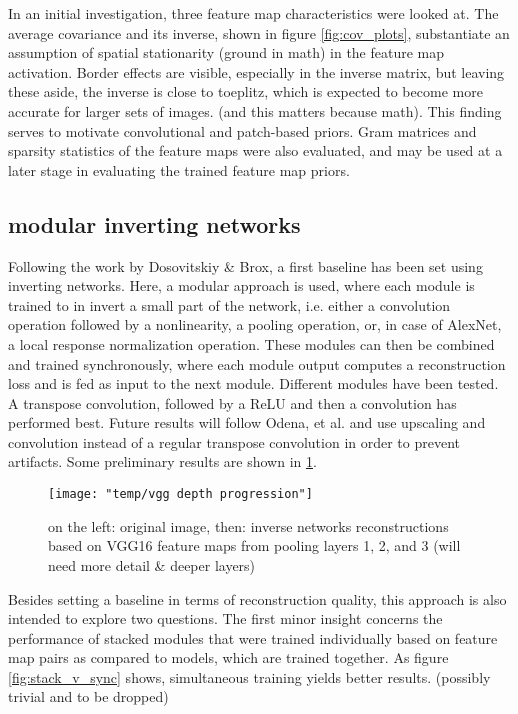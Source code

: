 \documentclass{article}
\begin{document}
In an initial investigation, three feature map characteristics were looked at. The average covariance and its inverse, shown in figure \ref{fig:cov_plots}, substantiate an assumption of spatial stationarity (ground in math) in the feature map activation. Border effects are visible, especially in the inverse matrix, but leaving these aside, the inverse is close to toeplitz, which is expected to become more accurate for larger sets of images. (and this matters because math). This finding serves to motivate convolutional and patch-based priors. Gram matrices and sparsity statistics of the feature maps were also evaluated, and may be used at a later stage in evaluating the trained feature map priors.

\subsection{modular inverting networks}

Following the work by Dosovitskiy \& Brox, a first baseline has been set using inverting networks. Here, a modular approach is used, where each module is trained to in invert a small part of the network, i.e. either a convolution operation followed by a nonlinearity, a pooling operation, or, in case of AlexNet, a local response normalization operation. These modules can then be combined and trained synchronously, where each module output computes a reconstruction loss and is fed as input to the next module. Different modules have been tested. A transpose convolution, followed by a ReLU and then a convolution has performed best. Future results will follow Odena, et al. and use upscaling and convolution instead of a regular transpose convolution in order to prevent artifacts. Some preliminary results are shown in \ref{fig:invert_net_progression}.



\begin{figure}
	\centering
	\texttt{[image: "temp/vgg depth progression"]}
	\caption{on the left: original image, then: inverse networks reconstructions based on VGG16 feature maps from pooling layers 1, 2, and 3 (will need more detail \& deeper layers)}
	\label{fig:invert_net_progression}
\end{figure}

Besides setting a baseline in terms of reconstruction quality, this approach is also intended to explore two questions. The first minor insight concerns the performance of stacked modules that were trained individually based on feature map pairs as compared to models, which are trained together. As figure \ref{fig:stack_v_sync} shows, simultaneous training yields better results. (possibly trivial and to be dropped)
\end{document}

